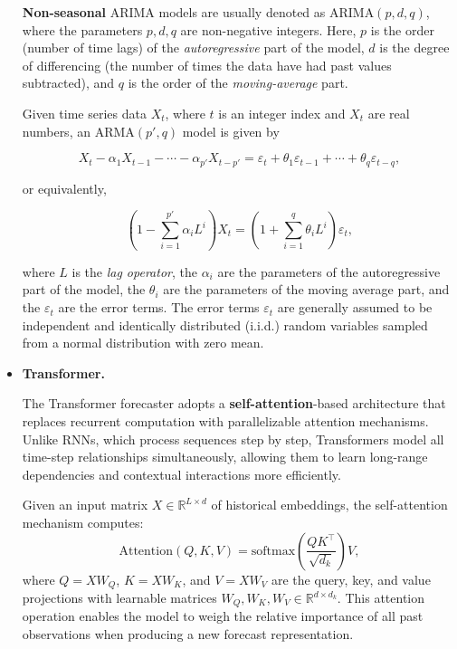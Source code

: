 \begin{itemize}
\textbf{Non-seasonal} ARIMA models are usually denoted as \( \mathrm{ARIMA}(p, d, q) \), 
where the parameters \( p, d, q \) are non-negative integers.  
Here, \( p \) is the order (number of time lags) of the \textit{autoregressive} part of the model,  
\( d \) is the degree of differencing (the number of times the data have had past values subtracted),  
and \( q \) is the order of the \textit{moving-average} part.  


Given time series data \( X_t \), where \( t \) is an integer index and \( X_t \) are real numbers,  
an \( \mathrm{ARMA}(p', q) \) model is given by

\begin{equation}
X_t - \alpha_1 X_{t-1} - \cdots - \alpha_{p'} X_{t-p'} 
= \varepsilon_t + \theta_1 \varepsilon_{t-1} + \cdots + \theta_q \varepsilon_{t-q},
\end{equation}

or equivalently,

\begin{equation}
\left( 1 - \sum_{i=1}^{p'} \alpha_i L^i \right) X_t
= \left( 1 + \sum_{i=1}^{q} \theta_i L^i \right) \varepsilon_t,
\end{equation}

where \( L \) is the \textit{lag operator}, 
the \( \alpha_i \) are the parameters of the autoregressive part of the model, 
the \( \theta_i \) are the parameters of the moving average part, 
and the \( \varepsilon_t \) are the error terms.  
The error terms \( \varepsilon_t \) are generally assumed to be 
independent and identically distributed (i.i.d.) random variables 
sampled from a normal distribution with zero mean.


  \item \textbf{Transformer.}

  The Transformer forecaster adopts a \textbf{self-attention}-based architecture that replaces recurrent computation 
with parallelizable attention mechanisms.  
Unlike RNNs, which process sequences step by step, 
Transformers model all time-step relationships simultaneously, 
allowing them to learn long-range dependencies and contextual interactions more efficiently.

Given an input matrix \( X \in \mathbb{R}^{L \times d} \) of historical embeddings, 
the self-attention mechanism computes:
\begin{equation}
\mathrm{Attention}(Q, K, V) = \mathrm{softmax}\!\left(\frac{QK^{\top}}{\sqrt{d_k}}\right)V,
\end{equation}
where \( Q = XW_Q \), \( K = XW_K \), and \( V = XW_V \) 
are the query, key, and value projections with learnable matrices \( W_Q, W_K, W_V \in \mathbb{R}^{d \times d_k} \).  
This attention operation enables the model to weigh the relative importance of all past observations 
when producing a new forecast representation.


\end{itemize}
